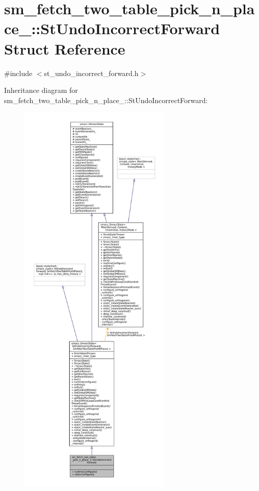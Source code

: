 \hypertarget{structsm__fetch__two__table__pick__n__place__1_1_1StUndoIncorrectForward}{}\section{sm\+\_\+fetch\+\_\+two\+\_\+table\+\_\+pick\+\_\+n\+\_\+place\+\_\+:\+:St\+Undo\+Incorrect\+Forward Struct Reference}
\label{structsm__fetch__two__table__pick__n__place__1_1_1StUndoIncorrectForward}


{\ttfamily \#include $<$st\+\_\+undo\+\_\+incorrect\+\_\+forward.\+h$>$}



Inheritance diagram for sm\+\_\+fetch\+\_\+two\+\_\+table\+\_\+pick\+\_\+n\+\_\+place\+\_\+:\+:St\+Undo\+Incorrect\+Forward\+:
\nopagebreak
\begin{figure}[H]
\begin{center}
\leavevmode
\includegraphics[height=550pt]{structsm__fetch__two__table__pick__n__place__1_1_1StUndoIncorrectForward__inherit__graph}
\end{center}
\end{figure}


